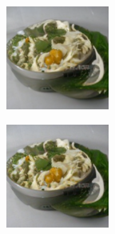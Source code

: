 \documentclass{article}
\begin{document}
\begin{figure}
\begin{subfigure}[b]{0.5\linewidth}
\begin{subfigure}[b]{0.242\linewidth}
        \end{subfigure}
        \begin{subfigure}[b]{0.242\linewidth}
        \includegraphics[width=\linewidth]{figures/imagenet128/solver_samples/imagenet128_fm_ot_101_20.png}
        \end{subfigure}
        \begin{subfigure}[b]{0.242\linewidth}
        \includegraphics[width=\linewidth]{figures/imagenet128/solver_samples/imagenet128_fm_ot_101_50.png}
        \end{subfigure}
    \end{subfigure}\\
    

\end{figure}
\end{document}
